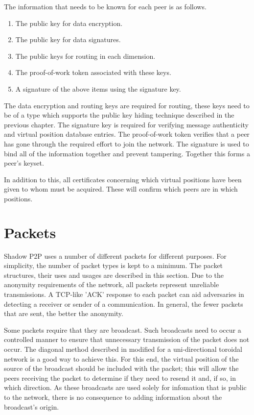 \documentclass[ %
                    author={Luke Murray},
                supervisor={Dr. Simon Hollis},
                     title={Shadow Peer-to-Peer Networks},
                  subtitle={},
                    degree={MEng},
                      year={2013} ]{thesis}
\begin{document}
The information that needs to be known for each peer is as follows.
\begin{enumerate}
\item The public key for data encryption.
\item The public key for data signatures.
\item The public keys for routing in each dimension.
\item The proof-of-work token associated with these keys.
\item A signature of the above items using the signature key.
\end{enumerate}
The data encryption and routing keys are required for routing, these keys need to be of a type which supports the public key hiding technique described in the previous chapter. The signature key is required for verifying message authenticity and virtual position database entries. The proof-of-work token verifies that a peer has gone through the required effort to join the network. The signature is used to bind all of the information together and prevent tampering. Together this forms a peer's keyset.

In addition to this, all certificates concerning which virtual positions have been given to whom must be acquired. These will confirm which peers are in which positions.

\section{Packets}

Shadow P2P uses a number of different packets for different purposes. For simplicity, the number of packet types is kept to a minimum. The packet structures, their uses and usages are described in this section. Due to the anonymity requirements of the network, all packets represent unreliable transmissions. A TCP-like 'ACK' response to each packet can aid adversaries in detecting a receiver or sender of a communication. In general, the fewer packets that are sent, the better the anonymity.

Some packets require that they are broadcast. Such broadcasts need to occur a controlled manner to ensure that unnecessary transmission of the packet does not occur. The diagonal method described in \cite{218454} modified for a uni-directional toroidal network is a good way to achieve this. For this end, the virtual position of the source of the broadcast should be included with the packet; this will allow the peers receiving the packet to determine if they need to resend it and, if so, in which direction. As these broadcasts are used solely for infomation that is public to the network, there is no consequence to adding information about the broadcast's origin. 
\end{document}
